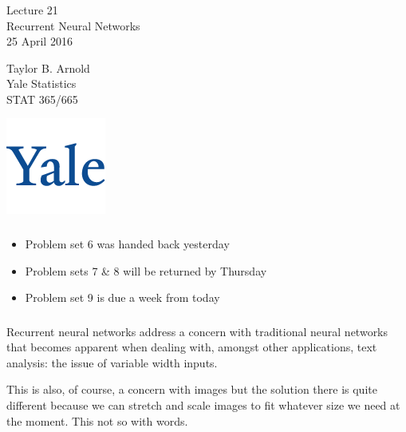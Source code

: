 \documentclass[xetex,mathserif,serif,aspectratio=169]{beamer}
\begin{document}
\begin{frame}[fragile] \frametitle{} \oldB \small

\vfill

{\fontsize{0.7cm}{0cm}\selectfont Lecture 21 \\\vspace{0.2cm}
Recurrent Neural Networks}\\\vspace{0.5cm}
25 April 2016

\vspace{2cm}

\begin{minipage}{0.6\textwidth}
Taylor B. Arnold \\
Yale Statistics \\
STAT 365/665
\end{minipage}
\hfill
\begin{minipage}{0.3\textwidth}\raggedleft
\includegraphics[scale=0.3]{../yale-logo.png}
\end{minipage}%

\end{frame}

\begin{frame}[fragile] \frametitle{} \oldB \small


\begin{itemize}
\item Problem set 6 was handed back yesterday
\item Problem sets 7 \& 8 will be returned by Thursday
\item Problem set 9 is due a week from today
\end{itemize}

\end{frame}

\begin{frame}[fragile] \frametitle{} \oldB \small


Recurrent neural networks address a concern with traditional
neural networks that becomes apparent when dealing with,
amongst other applications, text analysis: the issue of
variable width inputs.

\pause This is also, of course, a concern with images but the
solution there is quite different because we can stretch and
scale images to fit whatever size we need at the moment. This
not so with words.

\end{frame}
\end{document}
